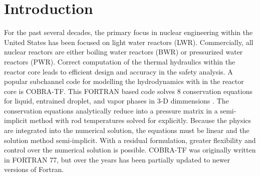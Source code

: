 \vspace*{-80mm}
\chapter{Introduction} \label{chapter1:introduction}

For the past several decades, the primary focus in nuclear engineering
within the United States has been focused on light water reactors (LWR).
Commercially, all nuclear reactors are either boiling water reactors (BWR)
or pressurized water reactors (PWR). Correct computation of the
thermal hydraulics within the reactor core leads to efficient design and
accuracy in the safety analysis. A popular subchannel code for modelling the
hydrodynamics with in the reactor core is COBRA-TF.
This FORTRAN based code solves 8 conservation equations for liquid,
entrained droplet, and vapor phases in 3-D dimmensions \cite{CTF_Theory}.
The conservation equations analytically reduce into a pressure matrix in a
semi-implicit  method with rod temperatures solved for explicitly. Because
the physics are integrated into the numerical solution, the equations must
be linear and the solution method semi-implicit. With a residual
formulation, greater flexibility and control over the numerical solution
is possible. COBRA-TF was originally written in FORTRAN 77, but over
the years has been partially updated to newer versions of Fortran.









